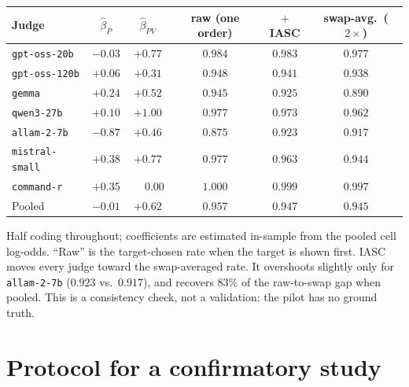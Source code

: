 \documentclass[10pt]{article}
\theoremstyle{remark}
\begin{document}
\begin{center}\small
\begin{tabular}{lccccc}
\toprule
Judge & $\hat\beta_P$ & $\hat\beta_{PV}$ & raw (one order) & $+$IASC & swap-avg.\ ($2\times$)\\
\midrule
\texttt{gpt-oss-20b}   & $-0.03$ & $+0.77$ & $0.984$ & $0.983$ & $0.977$\\
\texttt{gpt-oss-120b}  & $+0.06$ & $+0.31$ & $0.948$ & $0.941$ & $0.938$\\
\texttt{gemma}         & $+0.24$ & $+0.52$ & $0.945$ & $0.925$ & $0.890$\\
\texttt{qwen3-27b}     & $+0.10$ & $+1.00$ & $0.977$ & $0.973$ & $0.962$\\
\texttt{allam-2-7b}    & $-0.87$ & $+0.46$ & $0.875$ & $0.923$ & $0.917$\\
\texttt{mistral-small} & $+0.38$ & $+0.77$ & $0.977$ & $0.963$ & $0.944$\\
\texttt{command-r}     & $+0.35$ & $\phantom{+}0.00$ & $1.000$ & $0.999$ & $0.997$\\
\midrule
Pooled                 & $-0.01$ & $+0.62$ & $0.957$ & $0.947$ & $0.945$\\
\bottomrule
\end{tabular}
\end{center}
\noindent Half coding throughout; coefficients are estimated in-sample
from the pooled cell log-odds. ``Raw'' is the target-chosen rate when
the target is shown first. IASC moves every judge toward the
swap-averaged rate. It overshoots slightly only for
\texttt{allam-2-7b} ($0.923$ vs.\ $0.917$), and recovers 83\% of the
raw-to-swap gap when pooled. This is a consistency check, not a
validation: the pilot has no ground truth.

\section{Protocol for a confirmatory study}
\label{app:protocol}
\end{document}
